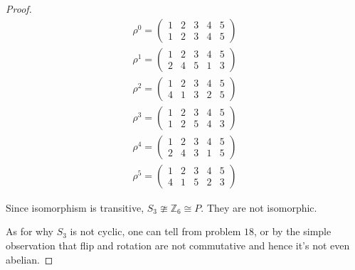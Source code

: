 \documentclass{article}
\begin{document}
\begin{itemize}
\begin{proof}
    \begin{equation*}
      \begin{split}
        \rho^0 =
        \begin{pmatrix}
          1 & 2 & 3 & 4 & 5\\
          1 & 2 & 3 & 4 & 5
        \end{pmatrix}\\
        \rho^1 =
        \begin{pmatrix}
          1 & 2 & 3 & 4 & 5\\
          2 & 4 & 5 & 1 & 3
        \end{pmatrix}\\
        \rho^2 =
        \begin{pmatrix}
          1 & 2 & 3 & 4 & 5\\
          4 & 1 & 3 & 2 & 5
        \end{pmatrix}\\
        \rho^3 =
        \begin{pmatrix}
          1 & 2 & 3 & 4 & 5\\
          1 & 2 & 5 & 4 & 3
        \end{pmatrix}\\
        \rho^4 =
        \begin{pmatrix}
          1 & 2 & 3 & 4 & 5\\
          2 & 4 & 3 & 1 & 5
        \end{pmatrix}\\
        \rho^5 =
        \begin{pmatrix}
          1 & 2 & 3 & 4 & 5\\
          4 & 1 & 5 & 2 & 3
        \end{pmatrix}
      \end{split}
    \end{equation*}

    Since isomorphism is transitive,
    $S_3 \ncong \mathbb{Z}_6 \cong P$. They are not isomorphic.

    As for why $S_3$ is not cyclic, one can tell from problem $18$, or
    by the simple observation that flip and rotation are not
    commutative and hence it's not even abelian.
  \end{proof}

\end{itemize}
\end{document}
